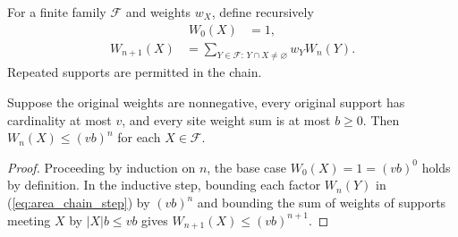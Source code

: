 \begin{definition}
    \label{def:area_chain_weight}
    \leanok
    For a finite family $\mathcal F$ and weights $w_X$, define recursively
    \begin{align}
        W_0(X) & =1,\label{eq:area_chain_initial}
    \end{align}
    \begin{align}
        W_{n+1}(X) & =\sum_{Y\in\mathcal F:\,Y\cap X\ne\varnothing}w_YW_n(Y).
        \label{eq:area_chain_step}
    \end{align}
    Repeated supports are permitted in the chain.
\end{definition}

\begin{lemma}
    \label{thm:area_chain_growth}
    \leanok
    Suppose the original weights are nonnegative, every original support
    has cardinality at most $v$, and every site weight sum is at most $b\ge0$.
    Then $W_n(X)\le(vb)^n$ for each $X\in\mathcal F$.
\end{lemma}
\begin{proof}
    \leanok
    Proceeding by induction on $n$, the base case $W_0(X)=1=(vb)^0$ holds
    by definition. In the inductive step, bounding each factor $W_n(Y)$
    in (\ref{eq:area_chain_step}) by $(vb)^n$ and bounding the sum of
    weights of supports meeting $X$ by $|X|b\le vb$ gives
    $W_{n+1}(X)\le(vb)^{n+1}$.
\end{proof}






